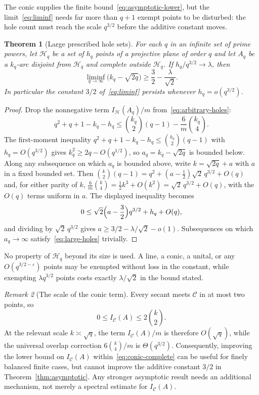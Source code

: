 \documentclass[11pt]{article}
\newtheorem{theorem}{Theorem}[section]
\theoremstyle{definition}
\theoremstyle{remark}
\newtheorem{remark}[theorem]{Remark}
\newcommand{\cC}{\mathcal{C}}
\newcommand{\cH}{\mathcal{H}}
\newcommand{\IC}{I_{\cC}}
\newcommand{\IH}{I_{\cH}}
\begin{document}
The conic supplies the finite bound~\eqref{eq:asymptotic-lower}, but the
limit~\eqref{eq:liminf} needs far more than $q+1$ exempt points to be
disturbed: the hole count must reach the scale $q^{3/2}$ before the
additive constant moves.

\begin{theorem}[Large prescribed hole sets]
\label{thm:large-holes}
For each $q$ in an infinite set of prime powers, let $\cH_q$ be a set of
$h_q$ points of a projective plane of order $q$ and let $A_q$ be a
$k_q$-arc disjoint from $\cH_q$ and complete outside $\cH_q$.  If
$h_q/q^{3/2}\to\lambda$, then
\begin{equation}
 \liminf_{q\to\infty}\bigl(k_q-\sqrt{2q}\bigr)\ge\frac32-\frac{\lambda}{\sqrt2}.
\label{eq:large-holes}
\end{equation}
In particular the constant $3/2$ of~\eqref{eq:liminf} persists whenever
$h_q=o(q^{3/2})$.
\end{theorem}

\begin{proof}
Drop the nonnegative term $\IH(A_q)/m$ from~\eqref{eq:arbitrary-holes}:
\[
 q^2+q+1-k_q-h_q\le\binom{k_q}{2}(q-1)-\frac6m\binom{k_q}{4}.
\]
The first-moment inequality $q^2+q+1-k_q-h_q\le\binom{k_q}{2}(q-1)$ with
$h_q=O(q^{3/2})$ gives $k_q^2\ge2q-O(q^{1/2})$, so $a_q=k_q-\sqrt{2q}$ is
bounded below.  Along any subsequence on which $a_q$ is bounded above,
write $k=\sqrt{2q}+a$ with $a$ in a fixed bounded set.  Then
$\binom{k}{2}(q-1)=q^2+(a-\tfrac12)\sqrt2\,q^{3/2}+O(q)$ and, for either
parity of $k$, $\frac6m\binom{k}{4}=\tfrac12k^3+O(k^2)=\sqrt2\,q^{3/2}+O(q)$,
with the $O(q)$ terms uniform in $a$.  The displayed inequality becomes
\[
 0\le\sqrt2\Bigl(a-\frac32\Bigr)q^{3/2}+h_q+O(q),
\]
and dividing by $\sqrt2\,q^{3/2}$ gives $a\ge3/2-\lambda/\sqrt2-o(1)$.
Subsequences on which $a_q\to\infty$ satisfy~\eqref{eq:large-holes}
trivially.
\end{proof}

No property of $\cH_q$ beyond its size is used.  A line, a conic, a
unital, or any $O(q^{3/2-\varepsilon})$ points may be exempted without
loss in the constant, while exempting $\lambda q^{3/2}$ points costs
exactly $\lambda/\sqrt2$ in the bound stated.

\begin{remark}[The scale of the conic term]
\label{rem:scale}
Every secant meets $\cC$ in at most two points, so
\[
 0\le\IC(A)\le2\binom{k}{2}.
\]
At the relevant scale $k\asymp\sqrt q$, the term $\IC(A)/m$ is therefore
$O(\sqrt q)$, while the universal overlap correction
$6\binom{k}{4}/m$ is $\Theta(q^{3/2})$.  Consequently, improving the lower
bound on $\IC(A)$ within~\eqref{eq:conic-complete} can be useful for finely
balanced finite cases, but cannot improve the additive constant $3/2$ in
Theorem~\ref{thm:asymptotic}.  Any stronger asymptotic result needs an
additional mechanism, not merely a spectral estimate for $\IC(A)$.
\end{remark}
\end{document}

